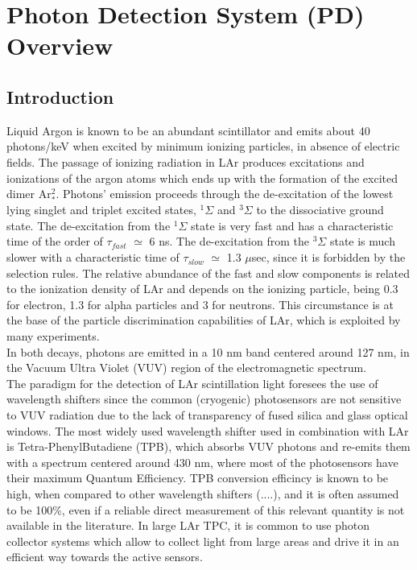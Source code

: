\section{Photon Detection System (PD) Overview}
\label{sec:fdsp-pd-ov}

\subsection{Introduction}
\label{sec:fdsp-pd-intro}
Liquid Argon is known to be an abundant scintillator and emits about 40 
photons/keV when excited  by minimum ionizing particles, in absence of 
electric fields. The passage of ionizing radiation in LAr produces excitations 
and ionizations of the argon atoms which ends up with the formation of the 
excited dimer Ar$^2_*$. Photons' emission proceeds through the de-excitation 
of the lowest lying singlet and triplet excited states, $^{1}\Sigma$ and 
$^{3}\Sigma$ to the dissociative ground state. The de-excitation from the 
$^{1}\Sigma$ state is very fast and has a characteristic time of the order of 
$\tau_{fast}$ $\simeq$ 6 ns. The de-excitation from the $^{3}\Sigma$ state is 
much slower with a characteristic time of $\tau_{slow}$ $\simeq$ 1.3 $\mu$sec, 
since it is forbidden by the selection rules. The relative abundance of the 
fast and slow components is related to the ionization density of LAr and 
depends on the ionizing particle, being 0.3 for electron, 1.3 for alpha 
particles and 3 for neutrons. This circumstance is at the base of the  
particle discrimination capabilities of LAr, which is exploited by many 
experiments.\\ 

In both decays, photons are emitted in a 10 nm band centered around 127 nm, in 
the Vacuum Ultra Violet (VUV) region of the electromagnetic spectrum.\\ 

The paradigm for the detection of LAr scintillation light foresees the use of 
wavelength shifters since the common (cryogenic) photosensors are not 
sensitive to VUV radiation due to the lack of transparency of fused silica and 
glass optical windows. The most widely used wavelength shifter used in 
combination with LAr is Tetra-PhenylButadiene (TPB), which absorbs VUV photons 
and re-emits them with a spectrum centered around 430 nm, where most of the 
photosensors have their maximum Quantum Efficiency. TPB conversion efficincy 
is known to be high, when compared to other wavelength shifters (....), and 
it is often assumed to be 100\%, even if a reliable direct measurement of this 
relevant quantity is not available in the literature. 
In large LAr TPC, it is common to use photon collector systems which allow to 
collect light from large areas and drive it in an efficient way towards the 
active sensors.\\

